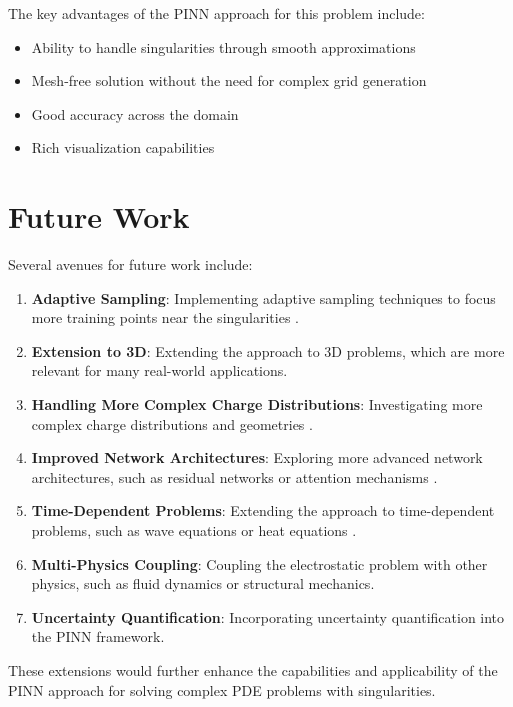 \documentclass[12pt,a4paper]{report}
\begin{document}
	The key advantages of the PINN approach for this problem include:
	\begin{itemize}
		\item Ability to handle singularities through smooth approximations
		\item Mesh-free solution without the need for complex grid generation
		\item Good accuracy across the domain
		\item Rich visualization capabilities
	\end{itemize}
	
	\section{Future Work}
	Several avenues for future work include:
	\begin{enumerate}
		\item \textbf{Adaptive Sampling}: Implementing adaptive sampling techniques to focus more training points near the singularities \cite{meng2020ppinn}.
		\item \textbf{Extension to 3D}: Extending the approach to 3D problems, which are more relevant for many real-world applications.
		\item \textbf{Handling More Complex Charge Distributions}: Investigating more complex charge distributions and geometries \cite{gao2021phygeonet}.
		\item \textbf{Improved Network Architectures}: Exploring more advanced network architectures, such as residual networks or attention mechanisms \cite{jagtap2020conservative}.
		\item \textbf{Time-Dependent Problems}: Extending the approach to time-dependent problems, such as wave equations or heat equations \cite{meng2020ppinn}.
		\item \textbf{Multi-Physics Coupling}: Coupling the electrostatic problem with other physics, such as fluid dynamics or structural mechanics.
		\item \textbf{Uncertainty Quantification}: Incorporating uncertainty quantification into the PINN framework.
	\end{enumerate}
	
	These extensions would further enhance the capabilities and applicability of the PINN approach for solving complex PDE problems with singularities.
	
	
	
	
\end{document}

